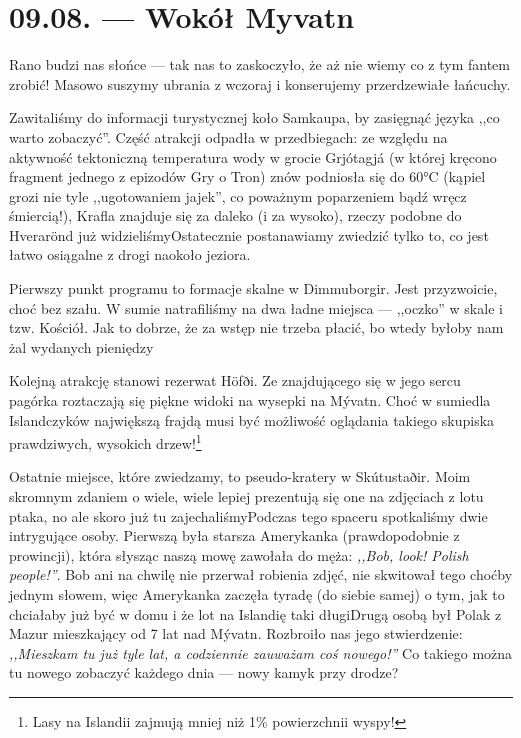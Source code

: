 \chapter*{09.08. --- Wokół Myvatn}

Rano budzi nas słońce --- tak nas to zaskoczyło, że aż nie wiemy co z tym fantem zrobić! \wink Masowo suszymy ubrania z wczoraj i konserujemy przerdzewiałe łańcuchy.

Zawitaliśmy do informacji turystycznej koło Samkaupa, by zasięgnąć języka ,,co warto zobaczyć''. Część atrakcji odpadła w przedbiegach: ze względu na aktywność tektoniczną temperatura wody w grocie Grjótagjá (w której kręcono fragment jednego z epizodów Gry o Tron) znów podniosła się do 60°C (kąpiel grozi nie tyle ,,ugotowaniem jajek'', co poważnym poparzeniem bądź wręcz śmiercią!), Krafla znajduje się za daleko (i za wysoko\textellipsis), rzeczy podobne do Hverarönd już widzieliśmy\textellipsis Ostatecznie postanawiamy zwiedzić tylko to, co jest łatwo osiągalne z drogi naokoło jeziora.

Pierwszy punkt programu to formacje skalne w Dimmuborgir. Jest przyzwoicie, choć bez szału. W sumie natrafiliśmy na dwa ładne miejsca --- ,,oczko'' w skale i tzw. Kościół. Jak to dobrze, że za wstęp nie trzeba płacić, bo wtedy byłoby nam żal wydanych pieniędzy \wink


Kolejną atrakcję stanowi rezerwat Höfði. Ze znajdującego się w jego sercu pagórka roztaczają się piękne widoki na wysepki na Mývatn. Choć w sumie\textellipsis dla Islandczyków największą frajdą musi być możliwość oglądania takiego skupiska prawdziwych, wysokich drzew!\footnote{Lasy na Islandii zajmują mniej niż 1\% powierzchnii wyspy!}

Ostatnie miejsce, które zwiedzamy, to pseudo-kratery w Skútustaðir. Moim skromnym zdaniem o wiele, wiele lepiej prezentują się one na zdjęciach z lotu ptaka, no ale skoro już tu zajechaliśmy\textellipsis Podczas tego spaceru spotkaliśmy dwie intrygujące osoby. Pierwszą była starsza Amerykanka (prawdopodobnie z prowincji), która słysząc naszą mowę zawołała do męża: \emph{,,Bob, look! Polish people!''}. Bob ani na chwilę nie przerwał robienia zdjęć, nie skwitował tego choćby jednym słowem, więc Amerykanka zaczęła tyradę (do siebie samej) o tym, jak to chciałaby już być w domu i że lot na Islandię taki długi\textellipsis Drugą osobą był Polak z Mazur mieszkający od 7 lat nad Mývatn. Rozbroiło nas jego stwierdzenie: \emph{,,Mieszkam tu już tyle lat, a codziennie zauważam coś nowego!''} Co takiego można tu nowego zobaczyć każdego dnia --- nowy kamyk przy drodze?

